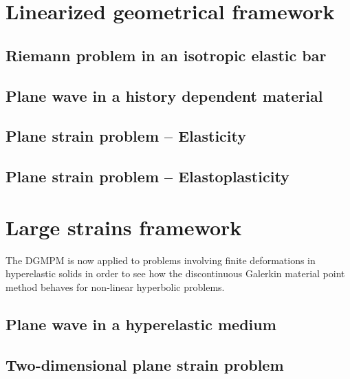 \section{Linearized geometrical framework}
\label{sec:hpp_simulations}

\subsection{Riemann problem in an isotropic elastic bar}
\label{subsec:hpp_bar}


\subsection{Plane wave in a history dependent material}
\label{subsec:hpp_planewave}


\subsection{Plane strain problem -- Elasticity}
\label{subsec:el_planestrain}


\subsection{Plane strain problem -- Elastoplasticity}
\label{subsec:ep_planestrain}


\section{Large strains framework}
\label{sec:he_simulations}
The DGMPM is now applied to problems involving finite deformations in hyperelastic solids in order to see how the discontinuous Galerkin material point method behaves for non-linear hyperbolic problems.
\subsection{Plane wave in a hyperelastic medium}
\label{subsec:he_planewave}


\subsection{Two-dimensional plane strain problem}
\label{subsec:he_plate}




